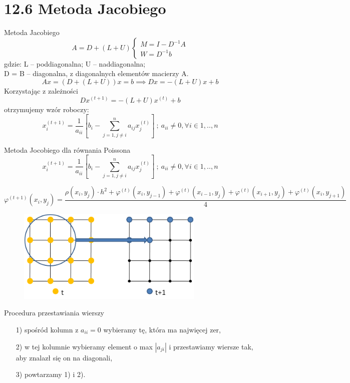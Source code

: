 \section{12.6 Metoda Jacobiego}

\begin{frame}{Metoda Jacobiego}
  $$
  A = D + (L+U)
  \begin{cases}
  M=I-D^{-1}A\\
  W=D^{-1}b
  \end{cases}
  $$
  gdzie: L -- poddiagonalna; U -- naddiagonalna;\\
  D = B -- diagonalna, z diagonalnych elementów macierzy A.
  $$Ax = (D+(L+U))x = b \implies Dx = -(L+U)x + b$$
  Korzystając z zależności
  $$\boxed{Dx^{(t+1)}= -(L+U)x^{(t)}+b}$$
  otrzymujemy wzór roboczy:
  $$x_i^{(t+1)}=\frac{1}{a_{ii}}[b_i-\sum_{j=1,j\neq i}^{n} a_{ij}x_j^{(t)}]\  ;\  a_{ii} \neq 0, \forall i \in {1,..,n} $$
\end{frame}
\begin{frame}{Metoda Jocobiego dla równania Poissona}
 \scriptsize{
 $$x_i^{(t+1)}=\frac{1}{a_{ii}}[b_i-\sum_{j=1,j\neq i}^{n} a_{ij}x_j^{(t)}]\  ;\  a_{ii} \neq 0, \forall i \in {1,..,n} $$
  }
  
  \scriptsize{
		    $$
		    \varphi^{(t+1)}(x_i,y_j)=
	 \frac{\rho(x_i,y_j)\cdot h^2 +\varphi^{(t)}(x_{i},y_{j-1})  + \varphi^{(t)}(x_{i-1}, y_j)
	  +\varphi^{(t)}(x_{i+1},y_{j})
	 +\varphi^{(t)}(x_{i},y_{j+1})}{4} 
	 $$
	 }
   \begin{figure}
       \centering
       \includegraphics[width=0.8\textwidth]{img/12/jacobi.png}
   \end{figure} 
\end{frame}
\begin{frame}
  \begin{block}{Procedura przestawiania wierszy}
    \begin{itemize}
      \item[1)] spośród kolumn z $a_{ii} = 0$ wybieramy tę, która ma najwięcej zer,
      \item[2)] w tej kolumnie wybieramy element o max $|a_{ji}|$ i przestawiamy wiersze tak, aby znalazł się on na diagonali,
      \item[3)] powtarzamy 1) i 2).
    \end{itemize}
  \end{block}
\end{frame}

